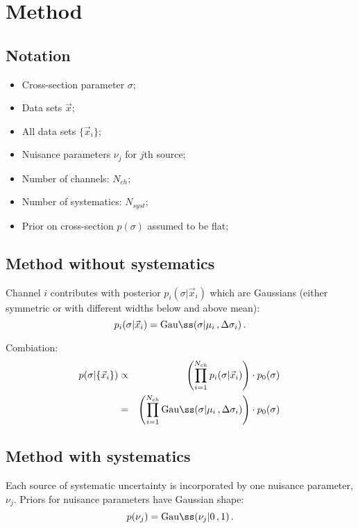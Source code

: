 \documentclass[11pt, a4paper]{article}
\begin{document}
\section*{Method}

\subsection*{Notation}
%
\begin{itemize}
\item Cross-section parameter $\sigma$;
\item Data sets $\vec{x}$; 
\item All data sets $\{ \vec{x}_{i}\}$;
\item Nuisance parameters $\nu_{j}$ for $j$th source;
\item Number of channels: $N_{ch}$;
\item Number of systematics: $N_{syst}$;
\item Prior on cross-section $p(\sigma)$ assumed to be flat;
\end{itemize}

\subsection*{Method without systematics} 
%
Channel $i$ contributes with posterior $p_{i}(\sigma|\vec{x}_{i})$
which are Gaussians (either symmetric or with different widths below
and above mean): 
%
\begin{equation}
p_{i}(\sigma|\vec{x}_{i}) = \mathrm{Gau{\ss}}(\sigma|\mu_{i}\, , \Delta \sigma_{i}) \, .
\end{equation}

Combiation:
%
\begin{eqnarray}
p(\sigma|\{ \vec{x}_{i}\}) & \propto & \left( \prod_{i=1}^{N_{ch}} p_{i}(\sigma|\vec{x}_{i}) \right) \cdot p_{0}(\sigma) \,  \\
                          &    =     & \left( \prod_{i=1}^{N_{ch}} \mathrm{Gau{\ss}}(\sigma|\mu_{i}\, , \Delta \sigma_{i}) \right) \cdot p_{0}(\sigma) \,  \\
\end{eqnarray}

\subsection*{Method with systematics} 
%
Each source of systematic uncertainty is incorporated by one nuisance
parameter, $\nu_{j}$. Priors for nuisance parameters have Gaussian
shape:
%
\begin{equation}
p(\nu_{j}) = \mathrm{Gau{\ss}}(\nu_{j}|0 \, , 1) \, .
\end{equation}
\end{document}
